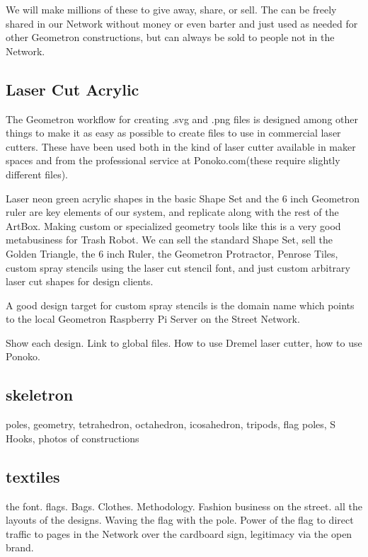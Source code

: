 We will make millions of these to give away, share, or sell.  The can be freely shared in our Network without money or even barter and just used as needed for other Geometron constructions, but can always be sold to people not in the Network.

\subsection{Laser Cut Acrylic}

The Geometron workflow for creating .svg and .png files is designed among other things to make it as easy as possible to create files to use in commercial laser cutters.  These have been used both in the kind of laser cutter available in maker spaces and from the professional service at Ponoko.com(these require slightly different files).  

Laser neon green acrylic shapes in the basic Shape Set and the 6 inch Geometron ruler are key elements of our system, and replicate along with the rest of the ArtBox.  Making custom or specialized geometry tools like this is a very good metabusiness for Trash Robot.  We can sell the standard Shape Set, sell the Golden Triangle, the 6 inch Ruler, the Geometron Protractor, Penrose Tiles, custom spray stencils using the laser cut stencil font, and just custom arbitrary laser cut shapes for design clients.  

A good design target for custom spray stencils is the domain name which points to the local Geometron Raspberry Pi Server on the Street Network. 

Show each design. Link to global files.  How to use Dremel laser cutter, how to use Ponoko.  

\subsection{skeletron}

poles, geometry, tetrahedron, octahedron, icosahedron, tripods, flag poles, S Hooks, photos of constructions

\subsection{textiles}

the font. flags. Bags. Clothes.  Methodology. Fashion business on the street. all the layouts of the designs.  Waving the flag with the pole. Power of the flag to direct traffic to pages in the Network over the cardboard sign, legitimacy via the open brand.

